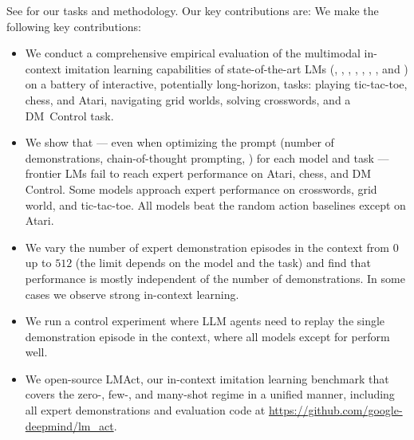 See  for our tasks and methodology.
\ificlr
Our key contributions are:
\else
We make the following key contributions:
\fi

\begin{itemize}
    \item We conduct a comprehensive empirical evaluation of the multimodal in-context imitation learning capabilities of state-of-the-art LMs (\claude, \flash, \pro, \expflash, \gpt, \mini, \preview, and \oone) on a battery of interactive, potentially long-horizon, tasks: playing tic-tac-toe, chess, and Atari, navigating grid worlds, solving crosswords, and a DM~Control task.
    \item We show that --- even when optimizing the prompt (number of demonstrations, chain-of-thought prompting, \etc) for each model and task --- frontier LMs fail to reach expert performance on Atari, chess, and DM Control.
    Some models approach expert performance on crosswords, grid world, and tic-tac-toe.
    All models beat the random action baselines except on Atari.
    \item We vary the number of expert demonstration episodes in the context from $0$ up to $512$ (the limit depends on the model and the task) and find that performance is mostly independent of the number of demonstrations. In some cases we observe strong in-context learning.
    \item We run a control experiment where LLM agents need to replay the single demonstration episode in the context, where all models except for \mini{} perform well.
    \item We open-source \ificlr
    LMAct,
    \else\fi our in-context imitation learning benchmark that covers the zero-, few-, and many-shot regime in a unified manner, including all expert demonstrations and evaluation code at
    \url{https://github.com/google-deepmind/lm_act}.
\end{itemize}

